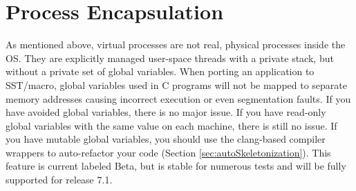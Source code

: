 \section{Process Encapsulation}
\label{sec:processEncapsulation}

As mentioned above, virtual processes are not real, physical processes inside the OS.
They are explicitly managed user-space threads with a private stack, but without a private set of global variables.
When porting an application to SST/macro, global variables used in C programs will not be mapped to separate memory addresses causing incorrect execution or even segmentation faults.
If you have avoided global variables, there is no major issue.  
If you have read-only global variables with the same value on each machine, there is still no issue.
If you have mutable global variables, you should use the  clang-based compiler wrappers to auto-refactor your code (Section \ref{sec:autoSkeletonization}).
This feature is current labeled Beta, but is stable for numerous tests and will be fully supported for release 7.1.

